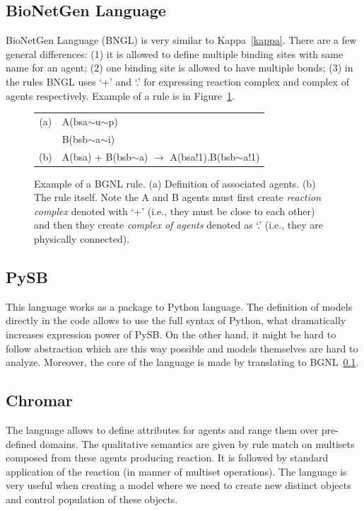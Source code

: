 \documentclass[12pt]{fithesis2}
\begin{document}
\subsection{BioNetGen Language}
\label{bngl}

BioNetGen Language (BNGL) is very similar to Kappa~\ref{kappa}. There are a few general differences: (1) it is allowed to define multiple binding sites with same name for an agent; (2) one binding site is allowed to have multiple bonds; (3) in the rules BNGL uses `+' and `.' for expressing reaction complex and complex of agents respectively. Example of a rule is in Figure~\ref{bngl-rule}.

\begin{figure}
\begin{center}
\begin{tabular}{c l}
(a) & A(bsa$\sim$u$\sim$p) \\
	& B(bsb$\sim$a$\sim$i) \\
(b) & A(bsa) + B(bsb$\sim$a) $\rightarrow$ A(bsa!1).B(bsb$\sim$a!1) \\
\end{tabular}
\end{center}
\caption{Example of a BGNL rule. (a) Definition of associated agents. (b) The rule itself. Note the A and B agents must first create \emph{reaction complex} denoted with `+' (i.e., they must be close to each other) and then they create \emph{complex of agents} denoted as `.' (i.e., they are physically connected).}\label{bngl-rule}
\end{figure}

\subsection{PySB}

This language works as a package to Python language. The definition of models directly in the code allows to use the full syntax of Python, what dramatically increases expression power of PySB. On the other hand, it might be hard to follow abstraction which are this way possible and models themselves are hard to analyze. Moreover, the core of the language is made by translating to BGNL~\ref{bngl}.

\subsection{Chromar}

The language allows to define attributes for agents and range them over pre-defined domains. The qualitative semantics are given by rule match on multisets composed from these agents producing reaction. It is followed by standard application of the reaction (in manner of multiset operations). The language is very useful when creating a model where we need to create new distinct objects and control population of these objects.
\end{document}
